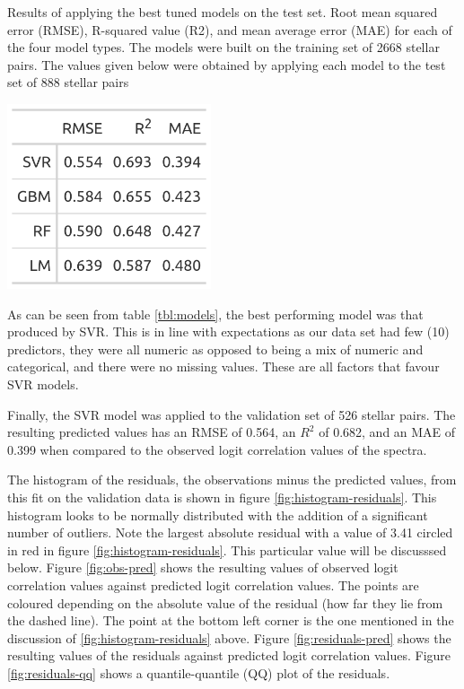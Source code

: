 \documentclass[preprint, 3p,
authoryear]{elsarticle} %
\begin{document}
\begin{table}
  \centering
  \caption{Results of applying the best tuned models on the test set. Root mean squared error (RMSE), R-squared value (R2), and mean average error (MAE) for each of the four model types. The models were built on the training set of 2668 stellar pairs. The values given below were obtained by applying each model to the test set of 888 stellar pairs}
  \label{tbl:models}
  \includegraphics[width=6cm]{figures/model-values-test}
\end{table}

As can be seen from table \ref{tbl:models}, the best performing model
was that produced by SVR. This is in line with expectations as our data
set had few (10) predictors, they were all numeric as opposed to being a
mix of numeric and categorical, and there were no missing values. These
are all factors that favour SVR models.

Finally, the SVR model was applied to the validation set of 526 stellar
pairs. The resulting predicted values has an RMSE of 0.564, an \(R^2\)
of 0.682, and an MAE of 0.399 when compared to the observed logit
correlation values of the spectra.

The histogram of the residuals, the observations minus the predicted
values, from this fit on the validation data is shown in figure
\ref{fig:histogram-residuals}. This histogram looks to be normally
distributed with the addition of a significant number of outliers. Note
the largest absolute residual with a value of 3.41 circled in red in
figure \ref{fig:histogram-residuals}. This particular value will be
discusssed below. Figure \ref{fig:obs-pred} shows the resulting values
of observed logit correlation values against predicted logit correlation
values. The points are coloured depending on the absolute value of the
residual (how far they lie from the dashed line). The point at the
bottom left corner is the one mentioned in the discussion of
\ref{fig:histogram-residuals} above. Figure \ref{fig:residuals-pred}
shows the resulting values of the residuals against predicted logit
correlation values. Figure \ref{fig:residuals-qq} shows a
quantile-quantile (QQ) plot of the residuals.
\end{document}
